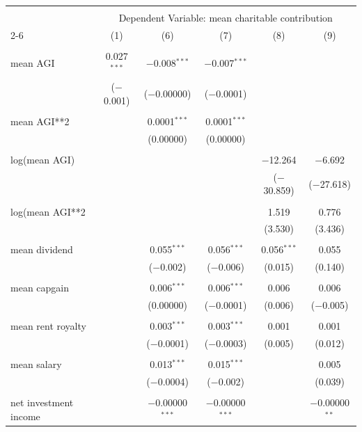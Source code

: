 \documentclass{article}
\begin{document}
\begingroup 
\tiny 
\begin{tabular}{@{\extracolsep{.001pt}}lccccc} 
\\[-1.8ex]\hline 
\hline \\[-1.8ex] 
 & \multicolumn{5}{c}{Dependent Variable: mean charitable contribution} \\ 
\cline{2-6} 
 & (1) & (6) & (7) & (8) & (9) \\ 
\hline \\[-1.8ex] 
 mean AGI & 0.027$^{***}$ & $-$0.008$^{***}$ & $-$0.007$^{***}$ &  &  \\ 
  & ($-$0.001) & ($-$0.00000) & ($-$0.0001) &  &  \\ 
  & & & & & \\ 
 mean AGI**2 &  & 0.0001$^{***}$ & 0.0001$^{***}$ &  &  \\ 
  &  & (0.00000) & (0.00000) &  &  \\ 
  & & & & & \\ 
 log(mean AGI) &  &  &  & $-$12.264 & $-$6.692 \\ 
  &  &  &  & ($-$30.859) & ($-$27.618) \\ 
  & & & & & \\ 
 log(mean AGI**2 &  &  &  & 1.519 & 0.776 \\ 
  &  &  &  & (3.530) & (3.436) \\ 
  & & & & & \\ 
 mean dividend &  & 0.055$^{***}$ & 0.056$^{***}$ & 0.056$^{***}$ & 0.055 \\ 
  &  & ($-$0.002) & ($-$0.006) & (0.015) & (0.140) \\ 
  & & & & & \\ 
 mean capgain &  & 0.006$^{***}$ & 0.006$^{***}$ & 0.006 & 0.006 \\ 
  &  & (0.00000) & ($-$0.0001) & (0.006) & ($-$0.005) \\ 
  & & & & & \\ 
 mean rent royalty &  & 0.003$^{***}$ & 0.003$^{***}$ & 0.001 & 0.001 \\ 
  &  & ($-$0.0001) & ($-$0.0003) & (0.005) & (0.012) \\ 
  & & & & & \\ 
 mean salary &  & 0.013$^{***}$ & 0.015$^{***}$ &  & 0.005 \\ 
  &  & ($-$0.0004) & ($-$0.002) &  & (0.039) \\ 
  & & & & & \\ 
 net investment income &  & $-$0.00000$^{***}$ & $-$0.00000$^{***}$ &  & $-$0.00000$^{**}$ \\ 

\end{tabular}
\end{document}
